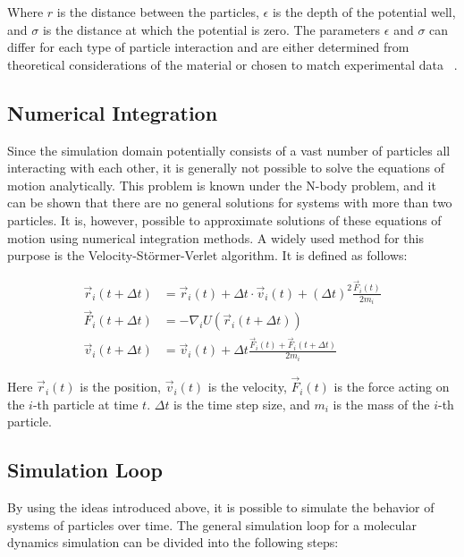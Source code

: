 Where $r$ is the distance between the particles, $\epsilon$ is the depth of the potential well, and $\sigma$ is the distance at which the potential is zero. The parameters $\epsilon$ and $\sigma$ can differ for each type of particle interaction and are either determined from theoretical considerations of the material or chosen to match experimental data~\cite{Maghfiroh2020} \cite{Irikura2021}.


\subsection{Numerical Integration}

Since the simulation domain potentially consists of a vast number of particles all interacting with each other, it is generally not possible to solve the equations of motion analytically. This problem is known under the N-body problem, and it can be shown that there are no general solutions for systems with more than two particles. It is, however, possible to approximate solutions of these equations of motion using numerical integration methods. A widely used method for this purpose is the Velocity-Störmer-Verlet algorithm. It is defined as follows:

\begin{align}
      \vec{r}_i(t + \Delta t) & = \vec{r}_i(t) + \Delta t \cdot \vec{v}_i(t) + (\Delta t)^2 \frac{\vec{F}_i(t)}{2m_i} \label{eq:verlet_position} \\
      \vec{F}_i(t + \Delta t) & = -\nabla_i U (\vec{r}_i(t + \Delta t)) \label{eq:verlet_force}                                                  \\
      \vec{v}_i(t + \Delta t) & = \vec{v}_i(t) + \Delta t  \frac{\vec{F}_i(t) + \vec{F}_i(t + \Delta t)}{2m_i} \label{eq:verlet_velocity}
\end{align}

Here $\vec{r}_i(t)$ is the position, $\vec{v}_i(t)$ is the velocity, $\vec{F}_i(t)$ is the force acting on the $i$-th particle at time $t$. $\Delta t$ is the time step size, and $m_i$ is the mass of the $i$-th particle.

\subsection{Simulation Loop}

By using the ideas introduced above, it is possible to simulate the behavior of systems of particles over time. The general simulation loop for a molecular dynamics simulation can be divided into the following steps:

